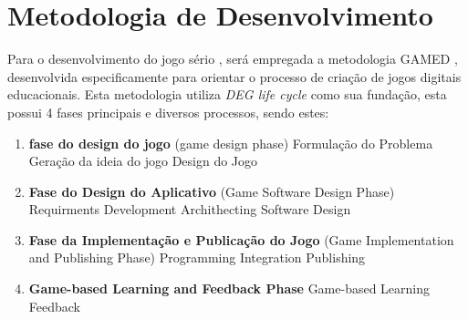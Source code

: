 \section{Metodologia de Desenvolvimento}

Para o desenvolvimento do jogo sério \cite{mouaheb2012serious}, será empregada a metodologia GAMED \cite{aslan2015gamed}, desenvolvida especificamente para orientar o processo de criação de jogos digitais educacionais. Esta metodologia utiliza \emph{DEG life cycle} como sua fundação, esta possui 4 fases principais e diversos processos, sendo estes:

\begin{enumerate}
  \item \textbf{fase do design do jogo} (game design phase)
    \subitem Formulação do Problema
    \subitem Geração da ideia do jogo
    \subitem Design do Jogo
  \item \textbf{Fase do Design do Aplicativo} (Game Software Design Phase)
    \subitem Requirments Development
    \subitem Archithecting
    \subitem Software Design
  \item \textbf{Fase da Implementação e Publicação do Jogo} (Game Implementation and Publishing Phase)
    \subitem Programming
    \subitem Integration
    \subitem Publishing
  \item \textbf{Game-based Learning and Feedback Phase}
    \subitem Game-based Learning
    \subitem Feedback
\end{enumerate}



